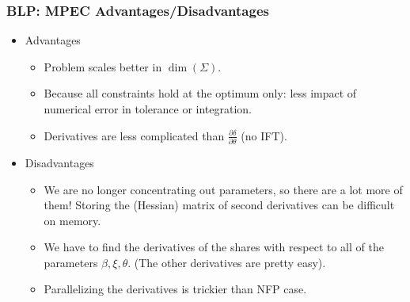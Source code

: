 \documentclass[xcolor=pdftex,dvipsnames,table,mathserif,aspectratio=169]{beamer}
\begin{document}
\begin{frame}
\frametitle{BLP: MPEC Advantages/Disadvantages}
\begin{itemize}
\item Advantages
\begin{itemize}
\item Problem scales better in $\dim(\Sigma)$.
\item Because all constraints hold at the optimum only: less impact of numerical error in tolerance or integration.
\item Derivatives are less complicated than $\frac{\partial \delta}{\partial \theta}$ (no IFT).
\end{itemize}
\item Disadvantages
\begin{itemize}
\item We are no longer concentrating out parameters, so there are a lot more of them! Storing the (Hessian) matrix of second derivatives can be difficult on memory.
\item We have to find the derivatives of the shares with respect to all of the parameters $\beta,\xi,\theta$. (The other derivatives are pretty easy).
\item Parallelizing the derivatives is trickier than NFP case.
\end{itemize}
\end{itemize}
\end{frame}


%
%

 

%
\end{document}
